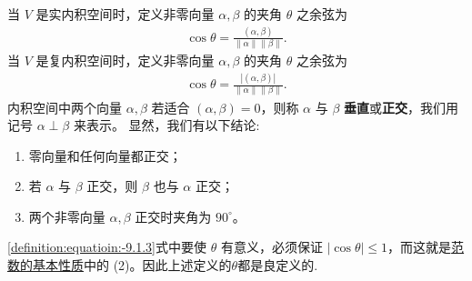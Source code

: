 \documentclass[../../main.tex]{subfiles}
\begin{document}
\begin{definition}[向量的夹角]
当 \(V\) 是实内积空间时，定义非零向量 \(\alpha,\beta\) 的夹角 \(\theta\) 之余弦为
\begin{align}
\cos\theta=\frac{(\alpha,\beta)}{\|\alpha\|\|\beta\|}.\label{definition:equatioin:-9.1.3}
\end{align}
当 \(V\) 是复内积空间时，定义非零向量 \(\alpha,\beta\) 的夹角 \(\theta\) 之余弦为
\begin{align*}
\cos\theta=\frac{|(\alpha,\beta)|}{\|\alpha\|\|\beta\|}.
\end{align*}
内积空间中两个向量 \(\alpha,\beta\) 若适合 \((\alpha,\beta)=0\)，则称 \(\alpha\) 与 \(\beta\) \textbf{垂直}或\textbf{正交}，我们用记号 \(\alpha\perp\beta\) 来表示。
显然，我们有以下结论:
\begin{enumerate}
\item 零向量和任何向量都正交；

\item 若 \(\alpha\) 与 \(\beta\) 正交，则 \(\beta\) 也与 \(\alpha\) 正交；

\item 两个非零向量 \(\alpha,\beta\) 正交时夹角为 \(90^{\circ}\)。
\end{enumerate}
\end{definition}
\begin{remark}
\eqref{definition:equatioin:-9.1.3}式中要使 \(\theta\) 有意义，必须保证 \(|\cos\theta|\leq1\)，而这就是\hyperref[theorem:范数的基本性质]{范数的基本性质}中的 (2)。因此上述定义的$\theta$都是良定义的.
\end{remark}
\end{document}
